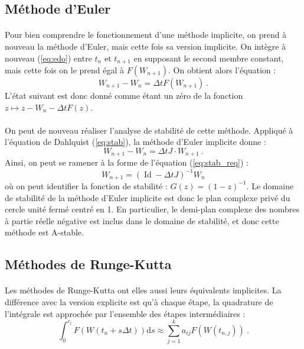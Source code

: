   \subsection{Méthode d'Euler}

    \paragraph{}
    Pour bien comprendre le fonctionnement d'une méthode implicite, on prend à nouveau la méthode d'Euler, mais cette fois sa version implicite.
    On intègre à nouveau (\ref{eq:edo}) entre $t_n$ et $t_{n+1}$ en supposant le second membre constant, mais cette fois on le prend égal à $F\left(W_{n+1}\right)$.
    On obtient alors l'équation :
    \[W_{n+1} - W_n = \Delta tF\left(W_{n+1}\right)\ .\]
    L'état suivant est donc donné comme étant un zéro de la fonction $z\mapsto z - W_n - \Delta tF\left(z\right)$.

    \paragraph{}
    On peut de nouveau réaliser l'analyse de stabilité de cette méthode.
    Appliqué à l'équation de Dahlquist (\ref{eq:stab}), la méthode d'Euler implicite donne :
    \[W_{n+1} - W_n = \Delta tJ\cdot W_{n+1}\ .\]
    Ainsi, on peut se ramener à la forme de l'équation (\ref{eq:stab_req}) :
    \[W_{n+1} = \left(\operatorname{Id} - \Delta tJ\right)^{-1}W_n\]
    où on peut identifier la fonction de stabilité : $G\left(z\right) = \left(1-z\right)^{-1}$.
    Le domaine de stabilité de la méthode d'Euler implicite est donc le plan complexe privé du cercle unité fermé centré en 1.
    En particulier, le demi-plan complexe des nombres à partie réelle négative est inclus dans le domaine de stabilité, et donc cette méthode est A-stable.


  \subsection{Méthodes de Runge-Kutta}

    \paragraph{}
    Les méthodes de Runge-Kutta ont elles aussi leurs équivalents implicites.
    La différence avec la version explicite est qu'à chaque étape, la quadrature de l'intégrale est approchée par l'ensemble des étapes intermédiaires :
    \[\int_0^{c_i}F\left(W\left(t_n + s\Delta t\right)\right)\mathrm{d}s \approx \sum_{j = 1}^ka_{ij}F\left(W\left(t_{n,j}\right)\right)\ .\]

